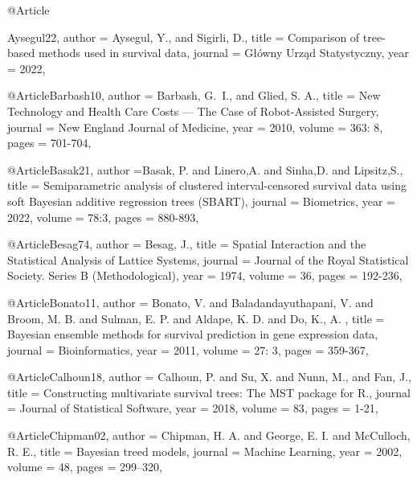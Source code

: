 @Article{Aysegul22,
   author =   {Aysegul, Y., and Sigirli, D.},
   title =    {Comparison of tree-based methods used in survival data},
   journal =      {Główny Urząd Statystyczny},
   year =     {2022},
   
 }


@Article{Barbash10,
   author =   {Barbash, G.~I., and Glied, S. A.},
   title =    {New Technology and Health Care Costs — The Case of Robot-Assisted Surgery},
   journal =      {New England Journal of Medicine},
   year =     {2010},
   volume =   {363: 8},
   pages =    {701-704},
 }



@Article{Basak21,
   author ={Basak, P. and Linero,A. and Sinha,D. and Lipsitz,S.},
   title = {Semiparametric analysis of clustered interval-censored survival data using soft Bayesian additive regression trees (SBART)},
   journal =      {Biometrics},
   year =     {2022},
   volume =   {78:3},
   pages =    {880-893},
 }






@Article{Besag74,
   author =   {Besag, J.},
   title =    {Spatial Interaction and the Statistical Analysis of Lattice Systems},
   journal =      {Journal of the Royal Statistical Society. Series B (Methodological)},
   year =     {1974},
   volume =   {36},
   pages =    {192-236},
 }


@Article{Bonato11,
   author =   {Bonato, V. and  Baladandayuthapani, V. and Broom, M. B. and Sulman, E. P. and Aldape, K. D. and Do, K., A. },
   title =    {Bayesian ensemble methods for survival prediction in gene expression data},
   journal =      {Bioinformatics},
   year =     {2011},
   volume =   {27: 3},
   pages =    {359-367},
 }




@Article{Calhoun18,
   author =   {Calhoun, P. and Su, X. and Nunn, M., and Fan, J.},
   title =    {Constructing multivariate survival trees: The MST package for R.},
   journal =      {Journal of Statistical Software},
   year =     {2018},
   volume =   {83},
   pages =    {1-21},
 }






@Article{Chipman02,
   author =   {Chipman, H. A. and George, E. I. and McCulloch, R. E.},
   title =    {Bayesian treed models},
   journal =      {Machine Learning},
   year =     {2002},
   volume =   {48},
   pages =    {299--320},
 }




